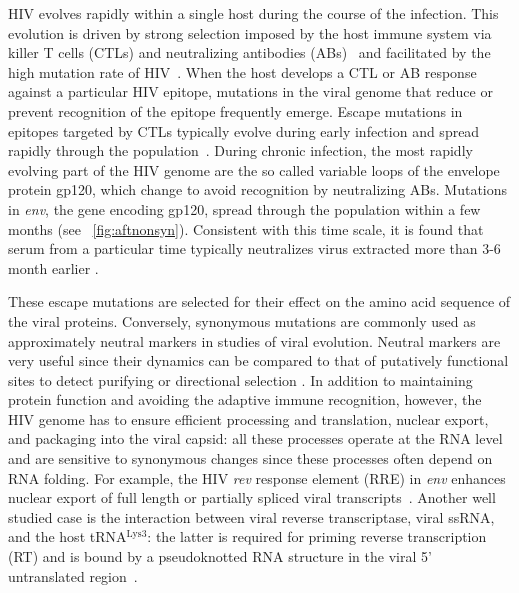 \documentclass[rmp, twocolumn]{revtex4}
\newcommand{\rev}{\textit{rev}}
\newcommand{\env}{\textit{env}}
\begin{document}
HIV evolves rapidly within a single host during the course of the infection.
This evolution is driven by strong selection imposed by the host immune system
via killer T cells (CTLs) and neutralizing antibodies
(ABs)~\citep{rambaut_causes_2004} and facilitated by the high
mutation rate of HIV~\citep{mansky_lower_1995,abram_nature_2010}. When the host
develops a CTL or AB response against a particular HIV epitope, mutations in the viral genome that
reduce or prevent recognition of the epitope frequently emerge. Escape mutations
in epitopes targeted by CTLs typically evolve during early infection and spread
rapidly through the population~\citep{mcmichael_immune_2009}. During chronic
infection, the most rapidly evolving part of the HIV genome are the so called
variable loops of the envelope protein gp120, which change to avoid recognition
by neutralizing ABs.  Mutations in \env, the gene encoding gp120, spread
through the population within a few months (see \figurename~\ref{fig:aftnonsyn}).
Consistent with this time scale, it is found that serum from a
particular time typically neutralizes virus extracted more than 3-6 month
earlier \citep{richman_rapid_2003}.

These escape mutations are selected for their effect on the amino acid
sequence of the viral proteins. Conversely, synonymous mutations are commonly
used as approximately neutral markers in studies of viral evolution. Neutral
markers are very useful since their dynamics can be compared to
that of putatively functional sites to detect purifying or directional selection
\citep{Bhatt:2011p43255,Hurst:2002p32608,Chen:2004p22606}.
In addition to maintaining protein function and avoiding the adaptive immune
recognition, however, the HIV genome has to ensure efficient processing and translation,
nuclear export, and packaging into the viral capsid: all these processes operate at the RNA
level and are sensitive to synonymous changes since these processes often
depend on RNA folding.
For example, the HIV \rev{} response element (RRE) in \env{} enhances nuclear export of
full length or partially spliced viral transcripts~\citep{fernandes_hiv-1_2012}.
Another well studied case is the interaction between viral reverse transcriptase, viral ssRNA, and the host
tRNA$^\text{Lys3}$: the latter is required for priming reverse transcription
(RT) and is bound by a pseudoknotted RNA structure in the viral 5'
untranslated region~\citep{barat_interaction_1991, paillart_vitro_2002}.
\end{document}
